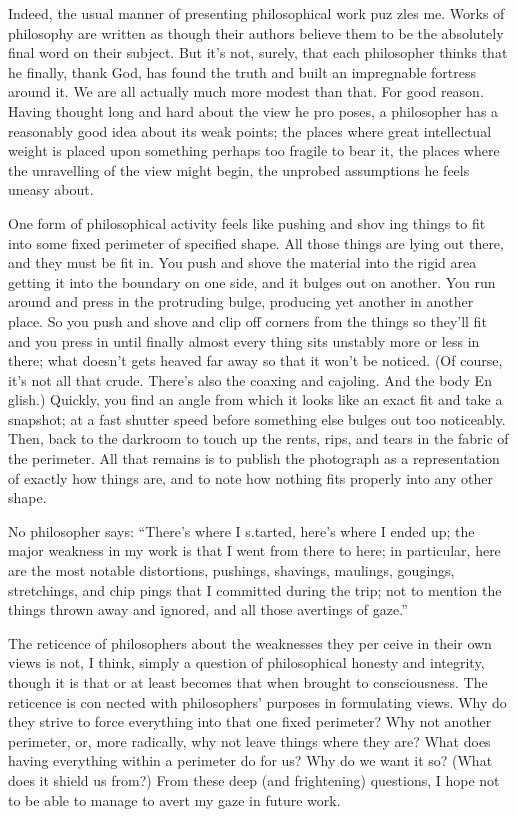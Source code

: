 \documentclass[11pt,openany]{book}
\begin{document}
Indeed, the usual manner of presenting philosophical work puz zles me. Works of philosophy are written as though their authors believe them to be the absolutely final word on their subject. But it's not, surely, that each philosopher thinks that he finally, thank God, has found the truth and built an impregnable fortress around it. We are all actually much more modest than that. For good reason. Having thought long and hard about the view he pro poses, a philosopher has a reasonably good idea about its weak points; the places where great intellectual weight is placed upon something perhaps too fragile to bear it, the places where the unravelling of the view might begin, the unprobed assumptions he feels uneasy about. 

One form of philosophical activity feels like pushing and shov ing things to fit into some fixed perimeter of specified shape. All those things are lying out there, and they must be fit in. You push and shove the material into the rigid area getting it into the boundary on one side, and it bulges out on another. You run around and press in the protruding bulge, producing yet another in another place. So you push and shove and clip off corners from the things so they'll fit and you press in until finally almost every thing sits unstably more or less in there; what doesn't gets heaved far away so that it won't be noticed. (Of course, it's not all that crude. There's also the coaxing and cajoling. And the body En glish.) Quickly, you find an angle from which it looks like an exact fit and take a snapshot; at a fast shutter speed before something else bulges out too noticeably. Then, back to the darkroom to touch up the rents, rips, and tears in the fabric of the perimeter. All that remains is to publish the photograph as a representation of exactly how things are, and to note how nothing fits properly into any other shape. 

No philosopher says: ``There's where I s.tarted, here's where I ended up; the major weakness in my work is that I went from there to here; in particular, here are the most notable distortions, pushings, shavings, maulings, gougings, stretchings, and chip pings that I committed during the trip; not to mention the things thrown away and ignored, and all those avertings of gaze.'' 

The reticence of philosophers about the weaknesses they per ceive in their own views is not, I think, simply a question of philosophical honesty and integrity, though it is that or at least becomes that when brought to consciousness. The reticence is con nected with philosophers' purposes in formulating views. Why do they strive to force everything into that one fixed perimeter? Why not another perimeter, or, more radically, why not leave things where they are? What does having everything within a perimeter do for us? Why do we want it so? (What does it shield us from?) From these deep (and frightening) questions, I hope not to be able to manage to avert my gaze in future work. 
\end{document}
